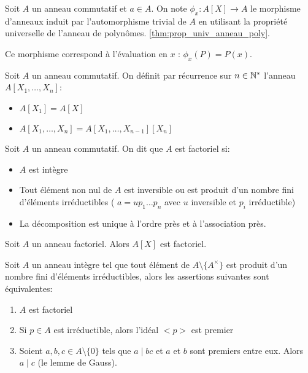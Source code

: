 \begin{definition}[Evaluation]
	Soit $A$ un anneau commutatif et $a \in A$. On note $\phi_x: A[X] \to A$ le morphisme d'anneaux
	induit par l'automorphisme trivial de $A$ en utilisant la propriété universelle de l'anneau de polynômes. \ref{thm:prop_univ_anneau_poly}.

	Ce morphisme correspond à l'évaluation en $x$ : $\phi_x(P) = P(x)$.

\end{definition}

\begin{definition}
	Soit $A$ un anneau commutatif. On définit par récurrence sur $n \in \mathbb{N}^*$ l'anneau $A[X_1, \dots, X_n]$:
	\begin{itemize}
		\item $A[X_1] = A[X]$
		\item $A[X_1, \dots, X_n] = A[X_1, \dots, X_{n-1}][X_n]$
	\end{itemize}
\end{definition}


\begin{definition}
	Soit $A$ un anneau commutatif. On dit que $A$ est factoriel si:
	\begin{itemize}
		\item $A$ est intègre
		\item Tout élément non nul de $A$ est inversible ou est produit d'un nombre fini
		      d'éléments irréductibles ( $a = u p_1 \dots p_n$ avec $u$ inversible et $p_i$ irréductible)
		\item La décomposition est unique à l'ordre près et à l'association près.
	\end{itemize}
\end{definition}

\begin{prop}[Admis]
	Soit $A$ un anneau factoriel. Alors $A[X]$ est factoriel.
\end{prop}


\begin{prop}
	Soit $A$ un anneau intègre tel que tout élément de $A\setminus\{A^{\times}\}$ est produit d'un nombre fini d'éléments irréductibles, alors les assertions suivantes sont équivalentes:
	\begin{enumerate}
		\item $A$ est factoriel
		\item Si $p \in A$ est irréductible, alors l'idéal $<p>$ est premier
		\item Soient $a,b,c \in A\setminus\{0\}$ tels que $a \mid bc$ et $a$ et $b$ sont premiers entre eux. Alors $a \mid c$ (le lemme de Gauss).
	\end{enumerate}
\end{prop}

